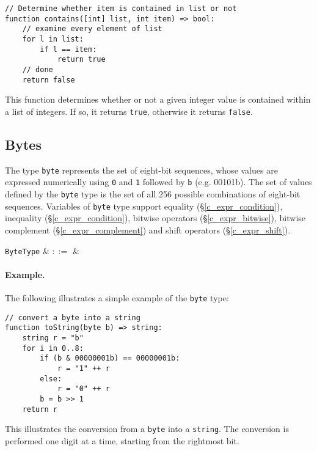 \begin{lstlisting}
// Determine whether item is contained in list or not
function contains([int] list, int item) => bool:
    // examine every element of list
    for l in list:
        if l == item:
            return true
    // done
    return false
\end{lstlisting}
This function determines whether or not a given integer value is contained within a list of integers.  If so, it returns \lstinline{true}, otherwise it returns \lstinline{false}.


\subsection{Bytes}
\label{c_types_byte}

The type \lstinline{byte} represents the set of eight-bit sequences, whose values are expressed numerically using \lstinline{0} and \lstinline{1} followed by \lstinline{b} (e.g. 00101b).  The set of values defined by the \lstinline{byte} type is the set of all 256 possible combinations of eight-bit sequences.   Variables of \lstinline{byte} type support equality (\S\ref{c_expr_condition}), inequality (\S\ref{c_expr_condition}), bitwise operators (\S\ref{c_expr_bitwise}), bitwise complement (\S\ref{c_expr_complement}) and shift operators (\S\ref{c_expr_shift}).

\begin{syntax}
 \verb+ByteType+ & $::=$ & \\
\end{syntax}

\paragraph{Example.} The following illustrates a simple example of the \lstinline{byte} type:

\begin{lstlisting}
// convert a byte into a string
function toString(byte b) => string:
    string r = "b"
    for i in 0..8:
        if (b & 00000001b) == 00000001b:
            r = "1" ++ r
        else:
            r = "0" ++ r
        b = b >> 1	
    return r
\end{lstlisting}
This illustrates the conversion from a \lstinline{byte} into a \lstinline{string}.  The conversion is performed one digit at a time, starting from the rightmost bit.


